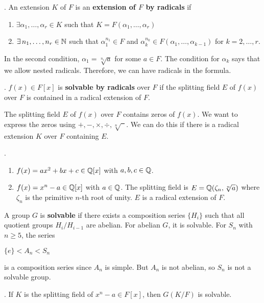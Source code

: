 
.  An extension \(K\) of \(F\) is an \textbf{extension of \(F\) by radicals} if
\begin{enumerate}
    \item \(\exists \alpha_1, \dots, \alpha_r \in K\) such that \(K = F(\alpha_1, \dots, \alpha_r)\)
    \item \(\exists n_1, \dots, n_r \in \N\) such that \(\alpha_1^{n_1} \in F\) and \(\alpha_k^{n_k} \in F(\alpha_1, \dots, \alpha_{k-1})\) for \(k = 2, \dots, r\).
\end{enumerate}

In the second condition, \(\alpha_1 = \sqrt[n_1]{a}\) for some \(a \in F\). The condition for \(\alpha_k\) says that we allow nested radicals. Therefore, we can have radicals in the formula.

.  \(f(x) \in F[x]\) is \textbf{solvable by radicals} over \(F\) if the splitting field \(E\) of \(f(x)\) over \(F\) is contained in a radical extension of \(F\).

The splitting field \(E\) of \(f(x)\) over \(F\) contains zeros of \(f(x)\). We want to express the zeros using \(+, -, \times, \div, \sqrt[n]{\phantom{a}}\). We can do this if there is a radical extension \(K\) over \(F\) containing \(E\).

\ex.
\begin{enumerate}
    \item \(f(x) = ax^2 + bx + c \in \mathbb{Q}[x]\) with \(a, b, c \in \mathbb{Q}\).
    \item \(f(x) = x^n - a \in \mathbb{Q}[x]\) with \(a \in \mathbb{Q}\). The splitting field is \(E = \mathbb{Q}(\zeta_n, \sqrt[n]{a})\) where \(\zeta_n\) is the primitive \(n\)-th root of unity. \(E\) is a radical extension of \(F\).
\end{enumerate}

\recall A group \(G\) is \textbf{solvable} if there exists a composition series \(\{H_i\}\) such that all quotient groups \(H_i/H_{i-1}\) are abelian. For abelian \(G\), it is solvable. For \(S_n\) with \(n \geq 5\), the series
\begin{center}
    \(\{e\} < A_n < S_n\)
\end{center}
is a composition series since \(A_n\) is simple. But \(A_n\) is not abelian, so \(S_n\) is not a solvable group.

\lemma. If \(K\) is the splitting field of \(x^n - a \in F[x]\), then \(G(K/F)\) is solvable.

